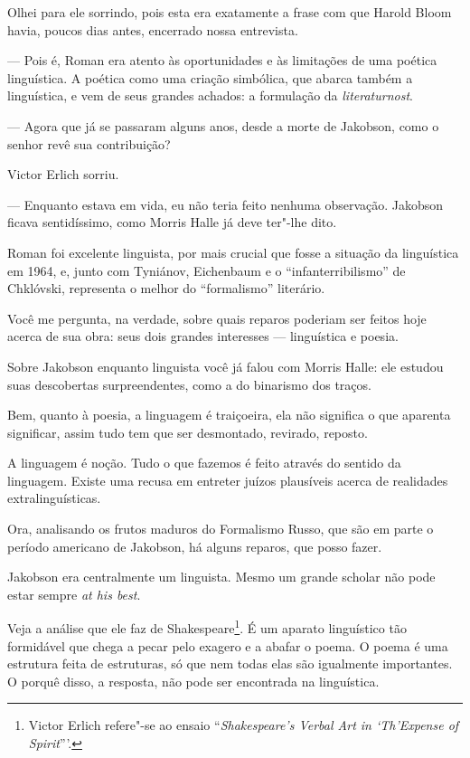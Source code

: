 Olhei para ele sorrindo, pois esta era exatamente a frase com que Harold
Bloom havia, poucos dias antes, encerrado nossa entrevista.

--- Pois é, Roman era atento às oportunidades e às limitações de uma
poética linguística. A poética como uma criação simbólica, que abarca
também a linguística, e vem de seus grandes achados: a formulação da
\emph{literaturnost}.

--- Agora que já se passaram alguns anos, desde a morte de Jakobson, como o
senhor revê sua contribuição?

Victor Erlich sorriu.

--- Enquanto estava em vida, eu não teria feito nenhuma observação.
Jakobson ficava sentidíssimo, como Morris Halle já deve ter"-lhe dito.

Roman foi excelente linguista, por mais crucial que fosse a situação da
linguística em 1964, e, junto com Tyniánov, Eichenbaum e o
``infanterribilismo'' de Chklóvski, representa o melhor do
``formalismo'' literário.

Você me pergunta, na verdade, sobre quais reparos poderiam ser feitos
hoje acerca de sua obra: seus dois grandes interesses --- linguística e
poesia.

Sobre Jakobson enquanto linguista você já falou com Morris Halle: ele
estudou suas descobertas surpreendentes, como a do binarismo dos traços.

Bem, quanto à poesia, a linguagem é traiçoeira, ela não significa o que
aparenta significar, assim tudo tem que ser desmontado, revirado,
reposto.

A linguagem é noção. Tudo o que fazemos é feito através do sentido da
linguagem. Existe uma recusa em entreter juízos plausíveis acerca de
realidades extralinguísticas.

Ora, analisando os frutos maduros do Formalismo Russo, que são em parte
o período americano de Jakobson, há alguns reparos, que posso fazer.

Jakobson era centralmente um linguista. Mesmo um grande scholar não pode
estar sempre \emph{at his best}.

Veja a análise que ele faz de Shakespeare\footnote{Victor Erlich
  refere"-se ao ensaio ``\emph{Shakespeare's Verbal Art in `Th'Expense of
  Spirit}'''.}. É um aparato linguístico tão formidável que chega a
pecar pelo exagero e a abafar o poema. O poema é uma estrutura feita de
estruturas, só que nem todas elas são igualmente importantes. O porquê
disso, a resposta, não pode ser encontrada na linguística.

